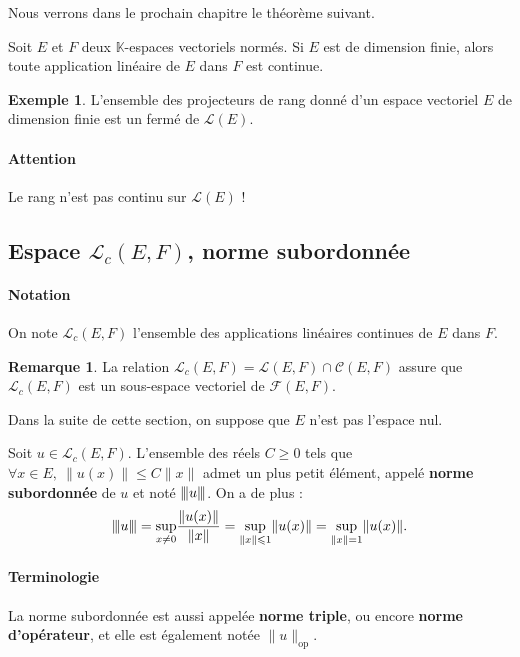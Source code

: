 \documentclass[french]{article}
\newcommand{\K}{\mathbb{K}}
\newcommand{\vertiii}[1]{{\left\vert\kern-0.25ex\left\vert\kern-0.25ex\left\vert #1 \right\vert\kern-0.25ex\right\vert\kern-0.25ex\right\vert}}
\theoremstyle{plain}
\theoremstyle{definition}
\newtheorem*{ex}{Exemple}
\newtheorem*{rmq}{Remarque}
\theoremstyle{remark}
\begin{document}
Nous verrons dans le prochain chapitre le théorème suivant.

\begin{thm}{}%
	Soit $E$ et $F$ deux $\K$-espaces vectoriels normés. Si $E$ est de dimension finie, alors toute application linéaire de $E$ dans $F$ est continue.
\end{thm}

\begin{ex}
	L'ensemble des projecteurs de rang donné d'un espace vectoriel $E$ de dimension finie est un fermé de $\mathcal{L}(E)$.
\end{ex}

\paragraph{Attention} Le rang n'est pas continu sur $\mathcal{L}(E)$ !

\subsection{Espace $\mathcal{L}_c(E,F)$, norme subordonnée}

\paragraph{Notation} On note $\mathcal{L}_c(E,F)$ l'ensemble des applications linéaires continues de $E$ dans $F$.

\begin{rmq}
	La relation $\mathcal{L}_c(E,F)=\mathcal{L}(E,F)\cap\mathcal{C}(E,F)$ assure que $\mathcal{L}_c(E,F)$ est un sous-espace vectoriel de $\mathcal{F}(E,F)$.
\end{rmq}

Dans la suite de cette section, on suppose que $E$ n'est pas l'espace nul.

\begin{thm}{}%
	Soit $u\in\mathcal{L}_c(E,F)$. L'ensemble des réels $C\geqslant 0$ tels que $\forall x\in E,\ \lVert u(x)\rVert\leqslant C\lVert x\rVert$ admet un plus petit élément, appelé \textbf{norme subordonnée} de $u$ et noté $\vertiii{u}$. On a de plus : $$\vertiii{u}=\underset{x\ne 0}{\sup}\frac{\lVert u(x)\rVert}{\lVert x\rVert}=\underset{\lVert x\rVert\leqslant1}{\sup}\lVert u(x)\rVert=\underset{\lVert x\rVert=1}{\sup}\lVert u(x)\rVert.$$
\end{thm}

\paragraph{Terminologie} La norme subordonnée est aussi appelée \textbf{norme triple}, ou encore \textbf{norme d'opérateur}, et elle est également notée $\lVert u\rVert_{\text{op}}$.
\end{document}

